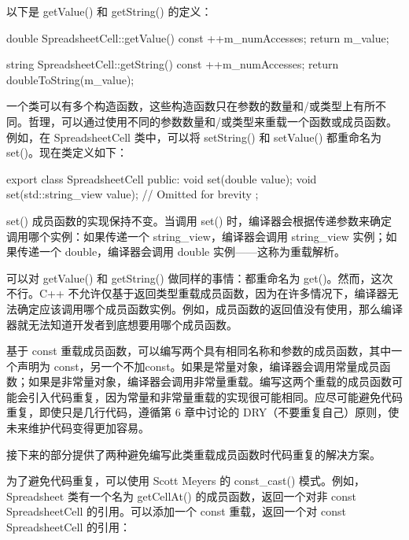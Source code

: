 以下是 getValue() 和 getString() 的定义：

\begin{cpp}
double SpreadsheetCell::getValue() const
{
    ++m_numAccesses;
    return m_value;
}

string SpreadsheetCell::getString() const
{
    ++m_numAccesses;
    return doubleToString(m_value);
}
\end{cpp}


一个类可以有多个构造函数，这些构造函数只在参数的数量和/或类型上有所不同。哲理，可以通过使用不同的参数数量和/或类型来重载一个函数或成员函数。例如，在 SpreadsheetCell 类中，可以将 setString() 和 setValue() 都重命名为 set()。现在类定义如下：

\begin{cpp}
export class SpreadsheetCell
{
    public:
        void set(double value);
        void set(std::string_view value);
        // Omitted for brevity
};
\end{cpp}

set() 成员函数的实现保持不变。当调用 set() 时，编译器会根据传递参数来确定调用哪个实例：如果传递一个 string\_view，编译器会调用 string\_view 实例；如果传递一个 double，编译器会调用 double 实例——这称为重载解析。

可以对 getValue() 和 getString() 做同样的事情：都重命名为 get()。然而，这次不行。C++ 不允许仅基于返回类型重载成员函数，因为在许多情况下，编译器无法确定应该调用哪个成员函数实例。例如，成员函数的返回值没有使用，那么编译器就无法知道开发者到底想要用哪个成员函数。


基于 const 重载成员函数，可以编写两个具有相同名称和参数的成员函数，其中一个声明为 const，另一个不加const。如果是常量对象，编译器会调用常量成员函数；如果是非常量对象，编译器会调用非常量重载。编写这两个重载的成员函数可能会引入代码重复，因为常量和非常量重载的实现很可能相同。应尽可能避免代码重复，即使只是几行代码，遵循第 6 章中讨论的 DRY（不要重复自己）原则，使未来维护代码变得更加容易。

接下来的部分提供了两种避免编写此类重载成员函数时代码重复的解决方案。


为了避免代码重复，可以使用 Scott Meyers 的 const\_cast() 模式。例如，Spreadsheet 类有一个名为 getCellAt() 的成员函数，返回一个对非 const SpreadsheetCell 的引用。可以添加一个 const 重载，返回一个对 const SpreadsheetCell 的引用：

